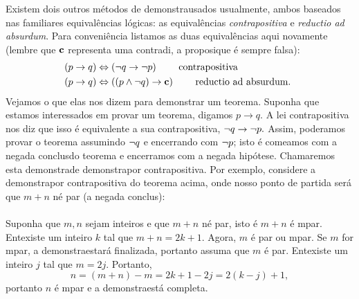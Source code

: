 Existem dois outros m\'etodos de demonstra\cao usados usualmente, ambos baseados nas familiares equival\^encias l\'ogicas: as equival\^encias {\it contrapositiva} e {\it reductio ad absurdum}. Para conveni\^encia listamos as duas equival\^encias aqui novamente (lembre que ${\bf c}$ representa uma contradi\caoi, a proposi\cao que \'e sempre falsa):
\begin{eqnarray*}
&(p\to q)\Leftrightarrow(\lnot q \to \lnot p) \quad\quad \textrm{ contrapositiva }\\
&(p\to q)\Leftrightarrow((p\wedge\lnot q)\to {\bf c})\quad\quad \textrm{ reductio ad absurdum. }
\end{eqnarray*} 
Vejamos o que elas nos dizem para demonstrar um teorema. Suponha que estamos interessados em provar um teorema, digamos $p\to q$. A lei contrapositiva nos diz que isso \'e equivalente a sua contrapositiva, $\lnot q\to\lnot p.$ Assim, poder\ih amos provar o teorema assumindo $\lnot q$ e encerrando com $\lnot p$; isto \'e come\cc amos com a nega\cao da conclus\ao do teorema e encerramos com a nega\cao da hip\'otese. Chamaremos esta demonstra\cao de demonstra\cao por contrapositiva. Por exemplo, considere a demonstra\cao por contrapositiva do teorema acima, onde nosso ponto de partida ser\'a que $m+n$ n\ao \'e par (a nega\cao da conclus\aoi): 
\\
\\
{\demo} Suponha que $m,n$ sejam inteiros e que $m+n$ n\ao \'e par, isto \'e $m+n$ \'e \ih mpar. Ent\ao existe um inteiro $k$ tal que $m+n=2k+1$. Agora, $m$ \'e par ou \ih mpar. Se $m$ for \ih mpar, a demonstra\cao estar\'a finalizada, portanto assuma que $m$ \'e par. Ent\ao existe um inteiro $j$ tal que $m=2j$. Portanto,
\[
n=(m+n)-m=2k+1-2j=2(k-j)+1,
\] 
portanto $n$ \'e \ih mpar e a demonstra\cao est\'a completa.  \fim

